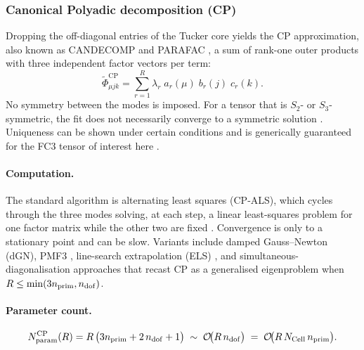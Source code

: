 \subsubsection{Canonical Polyadic decomposition (CP)}
\label{sub:fc3_cp}
Dropping the off-diagonal entries of the Tucker core yields the CP approximation, also
known as CANDECOMP and PARAFAC \cite{harshman_foundations_1970, hitchcock_expression_1927, carroll_analysis_1970}, a sum of
rank-one outer products with three independent factor vectors per term:
\begin{equation}\label{eq:fc3_cp_ansatz}
    \tilde\Phi_{\mu j k}^{\mathrm{CP}}
    = \sum_{r=1}^{R} \lambda_r\;a_r(\mu)\;b_r(j)\;c_r(k).
\end{equation}
No symmetry between the modes is imposed. For a tensor that is
$S_2$- or $S_3$-symmetric, the fit does not necessarily converge to a symmetric
solution \cite{ten_berge_typical_2004}. Uniqueness can be shown under certain conditions
\cite{kruskal_three-way_1977, sidiropoulos_uniqueness_2000} and is generically
guaranteed for the FC3 tensor of interest here
\cite{chiantini_generic_2012}.

\paragraph{Computation.} The standard algorithm is alternating least squares
(CP-ALS), which cycles through the three modes solving, at each step, a
linear least-squares problem for one factor matrix while the other two are
fixed \cite[Sec.~3.4]{kolda_tensor_2009}. Convergence is only to a
stationary point and can be slow. Variants include
damped Gauss--Newton (dGN), PMF3 \cite{paatero_weighted_1997},
line-search extrapolation (ELS) \cite{rajih_enhanced_2008}, and
simultaneous-diagonalisation approaches \cite{de_lathauwer_link_2006}
that recast CP as a generalised eigenproblem when
$R\le\min(3n_{\mathrm{prim}},n_{\mathrm{dof}})$.

\paragraph{Parameter count.}
\begin{equation}\label{eq:fc3_cp_params}
  N_{\mathrm{param}}^{\mathrm{CP}}(R)
  = R\,\bigl(3n_{\mathrm{prim}} + 2\,n_{\mathrm{dof}} + 1\bigr)
  \;\sim\; \mathcal{O}\!\bigl(R\,n_{\mathrm{dof}}\bigr)
  \;=\; \mathcal{O}\!\bigl(R\,N_{\mathrm{Cell}}\,n_{\mathrm{prim}}\bigr).
\end{equation}

